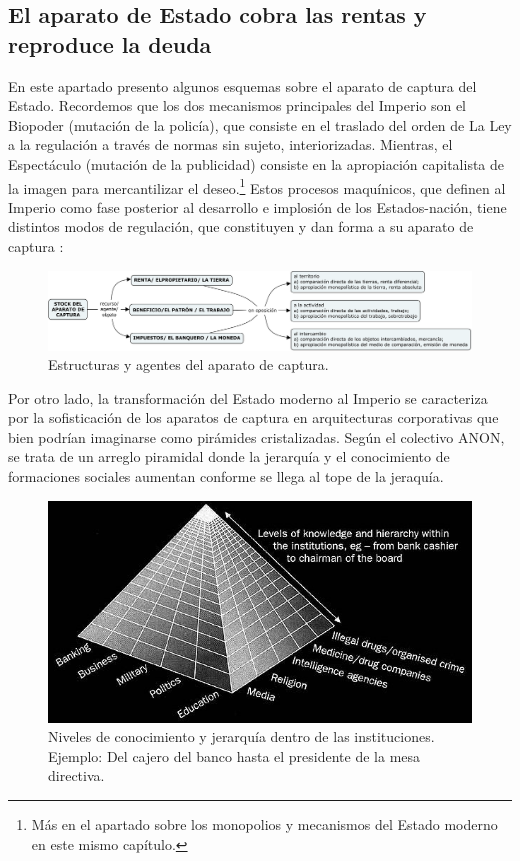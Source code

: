 \subsection{El aparato de Estado cobra las rentas y reproduce la deuda}
\label{sub:el-aparato-de-estado}

En este apartado presento algunos esquemas sobre el aparato de captura del Estado. Recordemos que los dos mecanismos principales del Imperio son el Biopoder (mutación de la policía), que consiste en el traslado del orden de La Ley a la regulación a través de normas sin sujeto, interiorizadas. Mientras, el Espectáculo (mutación de la publicidad) consiste en la apropiación capitalista de la imagen para mercantilizar el deseo.\footnote{Más en el apartado sobre los monopolios y mecanismos del Estado moderno en este mismo capítulo.} Estos procesos maquínicos, que definen al Imperio como fase posterior al desarrollo e implosión de los Estados-nación, tiene distintos modos de regulación, que constituyen y dan forma a su aparato de captura \autocite{deleuzeMilMesetasCapitalismo2002}:

\begin{figure}[htb]
  \centering
  \includegraphics[width=0.7\linewidth]{images/deleuze-captura.png}
  \caption{Estructuras y agentes del aparato de captura.}
  \label{fig:deleuze}
\end{figure}

Por otro lado, la transformación del Estado moderno al Imperio se caracteriza por la sofisticación de los aparatos de captura en arquitecturas corporativas que bien podrían imaginarse como pirámides cristalizadas. Según el colectivo ANON, se trata de un arreglo piramidal donde la jerarquía y el conocimiento de formaciones sociales aumentan conforme se llega al tope de la jeraquía.

\begin{figure}[htb]
  \centering
  \includegraphics[width=0.7\linewidth]{images/knowledge-hierarchy-piramid.png}
  \caption{Niveles de conocimiento y jerarquía dentro de las instituciones. Ejemplo: Del cajero del banco hasta el presidente de la mesa directiva.}
  \label{fig:hierarchy}
\end{figure}

